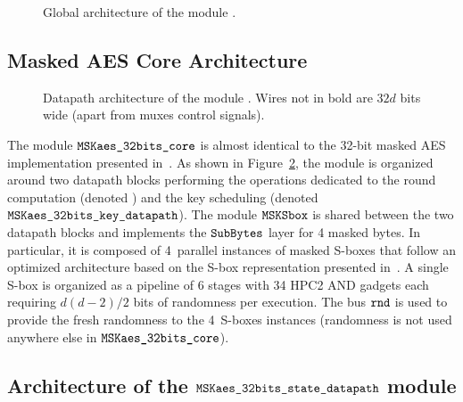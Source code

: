 \documentclass{scrartcl}
\begin{document}
\begin{figure}
    \centering
    \resizebox{\textwidth}{!}{
        \begin{tikzpicture}
            
        \end{tikzpicture}
    }
    \caption{Global architecture of the module \topName.}
    \label{fig:top_module_view}
\end{figure}

\subsection{Masked AES Core Architecture} 

\begin{figure}
    \centering
    \resizebox{\textwidth}{!}{
        \begin{tikzpicture}
            
        \end{tikzpicture}
    }
    \caption{Datapath architecture of the module \topModAES. Wires not in bold are $32d$ bits wide (apart from muxes control signals).}
    \label{fig:aes_glob_arch}
\end{figure}


The module $\texttt{MSKaes\_32bits\_core}$ is almost identical to the 32-bit masked AES implementation
presented in~\cite{DBLP:conf/cosade/MominCS22}. As shown in
Figure~\ref{fig:aes_glob_arch}, the module is organized around two datapath
blocks performing the operations dedicated to the round computation (denoted
\modAESdpState) and the key scheduling (denoted $\texttt{MSKaes\_32bits\_key\_datapath}$). The module
$\texttt{MSKSbox}$ is shared between the two datapath blocks and implements the $\texttt{SubBytes}$
layer for 4 masked bytes. In particular, it is composed of 4~parallel instances
of masked S-boxes that follow an optimized architecture based
on the S-box representation presented in~\cite{DBLP:conf/sec/BoyarP12}.
A single S-box is organized as a pipeline of 6 stages with 34 HPC2 AND gadgets
each requiring $d(d-2)/2$ bits of randomness per execution.
The bus
$\texttt{rnd}$ is used to provide the fresh randomness to the 4~S-boxes
instances (randomness is not used anywhere else in $\texttt{MSKaes\_32bits\_core}$).

\subsection{Architecture of the $\texttt{MSKaes\_32bits\_state\_datapath}$ module}
\label{sec:architecture}
\end{document}
